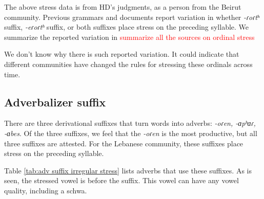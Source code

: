 The above stress data is from HD's judgments, as a person from the Beirut community. Previous grammars and documents report variation in whether \textit{-ɾoɾtʰ} suffix, \textit{-eɾoɾtʰ} suffix, or both suffixes place stress on the preceding syllable. We summarize the reported variation in \textcolor{red}{summarize all the sources on ordinal stress}

We don't know why there is such reported variation. It could indicate that different communities have changed the rules for stressing these ordinals across time.  



\subsection{Adverbalizer suffix}\label{section:stress:prestress:adverb}
There are three derivational suffixes that turn words into adverbs: \textit{-oɾen, -ɑpʰɑɾ, -ɑbes}. Of the three suffixes, we feel that the \textit{-oɾen} is the most productive, but all three suffixes are attested.   For the Lebanese community, these suffixes place stress on the preceding syllable. 

Table \ref{tab:adv suffix irregular stress} lists    adverbs that use these suffixes. As is seen, the stressed vowel is before the suffix. This vowel can have any vowel quality, including a schwa. 

